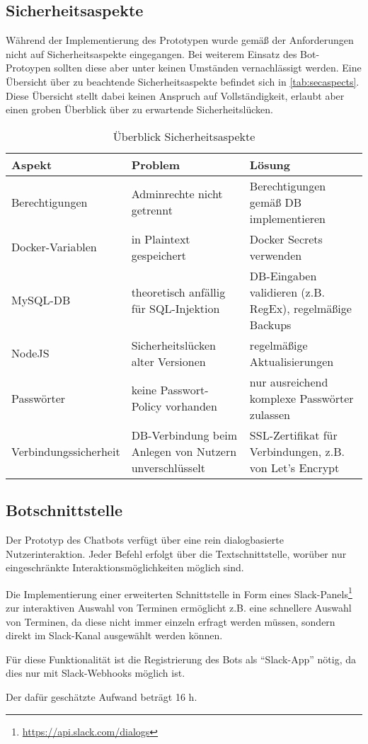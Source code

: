 \subsection{Sicherheitsaspekte}

Während der Implementierung des Prototypen wurde gemäß der Anforderungen nicht auf Sicherheitsaspekte eingegangen. Bei weiterem Einsatz des Bot-Protoypen sollten diese aber unter keinen Umständen vernachlässigt werden. Eine Übersicht über zu beachtende Sicherheitsaspekte befindet sich in \autoref{tab:secaspects}. Diese Übersicht stellt dabei keinen Anspruch auf Vollständigkeit, erlaubt aber einen groben Überblick über zu erwartende Sicherheitslücken.

\begin{table}[h]
    \centering
    \begin{tabularx}{\textwidth}{|X|X|X|}
        \hline
        \textbf{Aspekt} & \textbf{Problem} & \textbf{Lösung} \\
        \hline
        Berechtigungen & Adminrechte nicht getrennt & Berechtigungen gemäß DB implementieren \\
        \hline
        Docker-Variablen & in Plaintext gespeichert & Docker Secrets verwenden \\
        \hline
        MySQL-DB & theoretisch anfällig für SQL-Injektion & DB-Eingaben validieren (z.B. RegEx), regelmäßige Backups \\
        \hline
        NodeJS & Sicherheitslücken alter Versionen & regelmäßige Aktualisierungen \\
        \hline
        Passwörter & keine Passwort-Policy vorhanden & nur ausreichend komplexe Passwörter zulassen \\
        \hline
        Verbindungssicherheit & DB-Verbindung beim Anlegen von Nutzern unverschlüsselt & SSL-Zertifikat für Verbindungen, z.B. von Let's Encrypt \\
        \hline
    \end{tabularx}
    \caption{Überblick Sicherheitsaspekte}
    \label{tab:secaspects}
\end{table}

\subsection{Botschnittstelle}
Der Prototyp des Chatbots verfügt über eine rein dialogbasierte Nutzerinteraktion. Jeder Befehl erfolgt über die Textschnittstelle, worüber nur eingeschränkte Interaktionsmöglichkeiten möglich sind.

Die Implementierung einer erweiterten Schnittstelle in Form eines Slack-Panels\footnote{\url{https://api.slack.com/dialogs}} zur interaktiven Auswahl von Terminen ermöglicht z.B. eine schnellere Auswahl von Terminen, da diese nicht immer einzeln erfragt werden müssen, sondern direkt im Slack-Kanal ausgewählt werden können.

Für diese Funktionalität ist die Registrierung des Bots als \enquote{Slack-App} nötig, da dies nur mit Slack-Webhooks möglich ist.

Der dafür geschätzte Aufwand beträgt 16 h.
